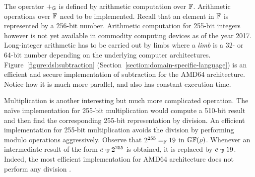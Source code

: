  
The operator $+_{\mathbb{G}}$ is defined by arithmetic computation over
$\mathbb{F}$. %
Arithmetic operations over $\mathbb{F}$ need to be implemented. Recall that
an element in $\mathbb{F}$ is represented by a 256-bit number. 
Arithmetic computation for 255-bit integers however is not yet
available in commodity computing devices as of the year
2017. Long-integer arithmetic has to be carried out by limbs where a
\emph{limb} is a 32- or 64-bit number depending on the underlying
computer architectures. Figure~\ref{figure:dsl:subtraction}
(Section~\ref{section:domain-specific-language}) is an
efficient and secure implementation of subtraction for the AMD64
architecture.  Notice how it is much more parallel, and also has
constant execution time.



Multiplication is another interesting but much more
complicated operation. The na\"ive implementation for 255-bit
multiplication would compute a 510-bit result and then find the
corresponding 255-bit representation by division. 
An efficient implementation for 255-bit multiplication avoids the
division by performing modulo operations aggressively. Observe that
$2^{255} =_{\mathbb{F}} 19$ in $\mathbb{GF}(\varrho)$. Whenever an intermediate
result of the form $c \cdot_{\mathbb{F}} 2^{255}$ is obtained, it is replaced by
$c \cdot_{\mathbb{F}} 19$. Indeed, the most efficient implementation for AMD64
architecture does not perform any division .


